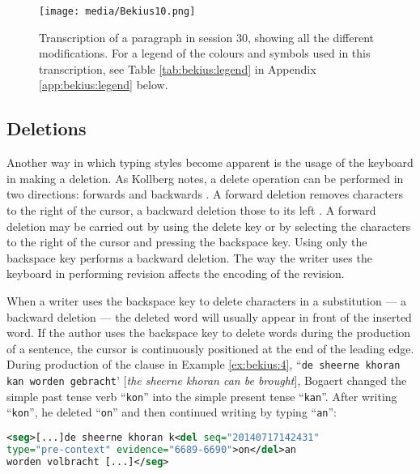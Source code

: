 \begin{paper}
\begin{figure}[H]
    \centering
    \texttt{[image: media/Bekius10.png]}
    \caption[Transcription of a paragraph in session 30, showing all the
different modifications.]{Transcription of a paragraph in session 30, showing all the different modifications. For a legend of the colours and symbols used in this transcription, see Table \ref{tab:bekius:legend} in Appendix \ref{app:bekius:legend} below.}
    \label{fig:bekius:session30}
\end{figure}


\subsection{Deletions}\label{sec:bekius:deletions}

Another way in which typing styles become apparent is the usage of the
keyboard in making a deletion. As Kollberg notes, a delete operation can
be performed in two directions: forwards and backwards \citep[29]{kollberg_s-notation_1998}. A
forward deletion removes characters to the right of the cursor, a
backward deletion those to its left \citep[29]{kollberg_s-notation_1998}. A forward
deletion may be carried out by using the delete key or by selecting the
characters to the right of the cursor and pressing the backspace key.
Using only the backspace key performs a backward deletion. The way the
writer uses the keyboard in performing revision affects the encoding of
the revision.

When a writer uses the backspace key to delete characters in a
substitution --- a backward deletion --- the deleted word will usually
appear in front of the inserted word. If the author uses the backspace
key to delete words during the production of a sentence, the cursor is
continuously positioned at the end of the leading edge. During
production of the clause in Example \ref{ex:bekius:4}, ``\verb|de sheerne khoran kan worden gebracht|' [\emph{the sheerne khoran can be brought}], Bogaert changed the
simple past tense verb ``\verb|kon|'' into the simple present tense ``\verb|kan|''.
After writing ``\verb|kon|'', he deleted ``\verb|on|'' and then continued writing by
typing ``\verb|an|'':

\begin{example}
\label{ex:bekius:4}
\begin{lstlisting}[language=XML]
<seg>[...]de sheerne khoran k<del seq="20140717142431"
type="pre-context" evidence="6689-6690">on</del>an
worden volbracht [...]</seg>
\end{lstlisting}
\end{example}


\end{paper}
